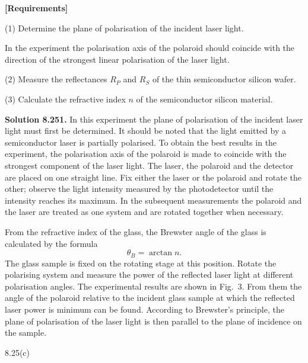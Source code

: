 \textbf{[Requirements]}

(1) Determine the plane of polarisation of the incident laser light.

In the experiment the polarisation axis of the polaroid should coincide with the direction of the strongest linear polarisation of the laser light.

(2) Measure the reflectances $R_P$ and $R_S$ of the thin semiconductor silicon wafer.

(3) Calculate the refractive index $n$ of the semiconductor silicon material.

\textbf{Solution 8.25}\quad \textbf{1.} In this experiment the plane of polarisation of the incident laser light must first be determined. It should be noted that the light emitted by a semiconductor laser is partially polarised. To obtain the best results in the experiment, the polarisation axis of the polaroid is made to coincide with the strongest component of the laser light. The laser, the polaroid and the detector are placed on one straight line. Fix either the laser or the polaroid and rotate the other; observe the light intensity measured by the photodetector until the intensity reaches its maximum. In the subsequent measurements the polaroid and the laser are treated as one system and are rotated together when necessary.

From the refractive index of the glass, the Brewster angle of the glass is calculated by the formula
\begin{equation}
\theta_B=\arctan n. \tag{4}
\end{equation}
The glass sample is fixed on the rotating stage at this position. Rotate the polarising system and measure the power of the reflected laser light at different polarisation angles. The experimental results are shown in Fig.~3. From them the angle of the polaroid relative to the incident glass sample at which the reflected laser power is minimum can be found. According to Brewster's principle, the plane of polarisation of the laser light is then parallel to the plane of incidence on the sample.

\begin{figbox}{8.25(c)}
\end{figbox}

